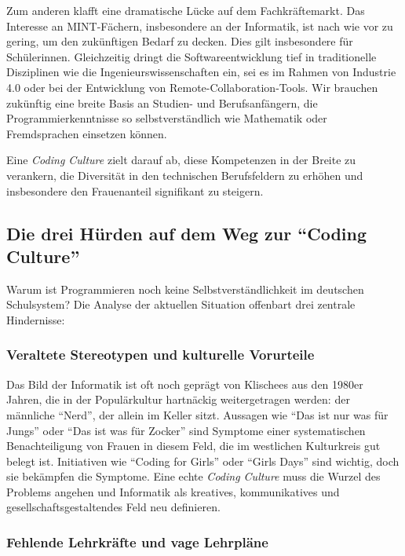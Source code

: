 \documentclass[a5paper,pagesize,10pt,bibtotoc,pointlessnumbers,
normalheadings,DIV=9,twoside=false]{scrbook}
\begin{document}
Zum anderen klafft eine dramatische Lücke auf dem Fachkräftemarkt. Das Interesse an MINT-Fächern, insbesondere an der Informatik, ist nach wie vor zu gering, um den zukünftigen Bedarf zu decken. Dies gilt insbesondere für Schülerinnen. Gleichzeitig dringt die Softwareentwicklung tief in traditionelle Disziplinen wie die Ingenieurswissenschaften ein, sei es im Rahmen von Industrie 4.0 oder bei der Entwicklung von Remote-Collaboration-Tools. Wir brauchen zukünftig eine breite Basis an Studien- und Berufsanfängern, die Programmierkenntnisse so selbstverständlich wie Mathematik oder Fremdsprachen einsetzen können.

Eine \textit{Coding Culture} zielt darauf ab, diese Kompetenzen in der Breite zu verankern, die Diversität in den technischen Berufsfeldern zu erhöhen und insbesondere den Frauenanteil signifikant zu steigern.

\subsection*{Die drei Hürden auf dem Weg zur ``Coding Culture''}

Warum ist Programmieren noch keine Selbstverständlichkeit im deutschen Schulsystem? Die Analyse der aktuellen Situation offenbart drei zentrale Hindernisse:

\subsubsection{Veraltete Stereotypen und kulturelle Vorurteile}

Das Bild der Informatik ist oft noch geprägt von Klischees aus den 1980er Jahren, die in der Populärkultur hartnäckig weitergetragen werden: der männliche ``Nerd'', der allein im Keller sitzt. Aussagen wie ``Das ist nur was für Jungs'' oder ``Das ist was für Zocker'' sind Symptome einer systematischen Benachteiligung von Frauen in diesem Feld, die im westlichen Kulturkreis gut belegt ist. Initiativen wie ``Coding for Girls'' oder ``Girls Days'' sind wichtig, doch sie bekämpfen die Symptome. Eine echte \textit{Coding Culture} muss die Wurzel des Problems angehen und Informatik als kreatives, kommunikatives und gesellschaftsgestaltendes Feld neu definieren.

\subsubsection{Fehlende Lehrkräfte und vage Lehrpläne}
\end{document}
